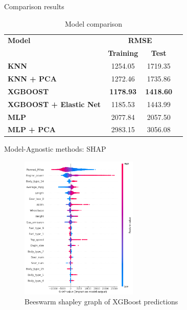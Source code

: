 \documentclass{beamer}
\begin{document}
    \begin{frame}{Comparison results} 

    \begin{table}[h]
    \centering
    \caption{Model comparison}

    \begin{tabular}{lccc}
        \toprule
        \textbf{Model} & \multicolumn{2}{c}{\textbf{RMSE}} \\
         & \textbf{Training} & \textbf{Test} \\
        \midrule
        \textbf{KNN} & 1254.05 & 1719.35 \\
        \textbf{KNN + PCA} & 1272.46 & 1735.86 \\
        \textbf{XGBOOST} & \textbf{1178.93} & \textbf{1418.60} \\
        \textbf{XGBOOST + Elastic Net} & 1185.53 & 1443.99 \\
        \textbf{MLP} & 2077.84 & 2057.50 \\
        \textbf{MLP + PCA} & 2983.15 & 3056.08 \\
        \bottomrule
    \end{tabular}
    \label{Model_comparison}
    \end{table}
      
    \end{frame}


    
    \begin{frame}{Model-Agnostic methods: SHAP}
    \begin{figure}[ht]
        \centering
        \includegraphics[width=0.5\textwidth]{xgboostshapely.png}
        \caption{Beeswarm shapley graph of XGBoost predictions}
        \label{xgboostshapley}
    \end{figure}
    \end{frame}
\end{document}
